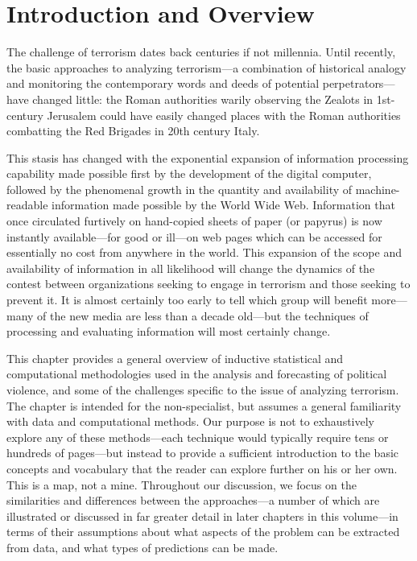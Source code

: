 \documentclass[graybox]{svmult}
\begin{document}
\section{Introduction and Overview}
\label{sec:intro}

The challenge of terrorism dates back centuries if not millennia. Until recently, the basic approaches to analyzing terrorism---a combination of historical analogy and monitoring the contemporary words and deeds of potential perpetrators---have changed little: the Roman authorities warily observing the Zealots in 1st-century Jerusalem could have easily changed places with the Roman authorities combatting the Red Brigades in 20th century Italy.

This stasis has changed with the exponential expansion of information processing capability made possible first by the development of the digital computer, followed by the phenomenal growth in the quantity and availability of machine-readable information made possible by the World Wide Web. Information that once circulated furtively on hand-copied sheets of paper (or papyrus) is now instantly available---for good or ill---on web pages which can be accessed for essentially no cost from anywhere in the world. This expansion of the scope and availability of information in all likelihood will change the dynamics of the contest between organizations seeking to engage in terrorism and those seeking to prevent it. It is almost certainly too early to tell which group will benefit more---many of the new media are less than a decade old---but the techniques of processing and evaluating information will most certainly change.

This chapter provides a general overview of inductive statistical and computational methodologies used in the analysis and forecasting of political violence, and some of the challenges specific to the issue of analyzing terrorism.   The chapter is intended for the non-specialist, but assumes a general familiarity with data and computational methods. Our purpose is not to exhaustively explore any of these methods---each technique would typically require tens or hundreds of pages---but instead to provide a sufficient introduction to the basic concepts and vocabulary that the reader can explore further on his or her own. This is a map, not a mine. Throughout our discussion, we focus on the similarities and differences between the approaches---a number of which are illustrated or discussed in far greater detail in later chapters in this volume---in terms of their assumptions about what aspects of the problem can be extracted from data, and what types of predictions can be made.
\end{document}
